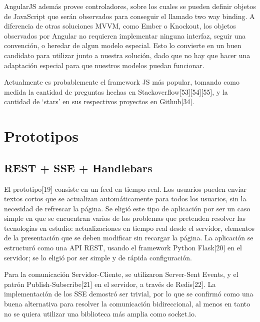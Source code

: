 \documentclass[doc,helv,longtable]{article}
\begin{document}
AngularJS además provee controladores, sobre los cuales se pueden definir objetos de JavaScript que serán observados para conseguir el llamado two way binding. A diferencia de otras soluciones MVVM, como Ember o Knockout, los objetos observados por Angular no requieren implementar ninguna interfaz, seguir una convención, o heredar de algun modelo especial. Esto lo convierte en un buen candidato para utilizar junto a nuestra solución, dado que no hay que hacer una adaptación especial para que nuestros modelos puedan funcionar. 

Actualmente es probablemente el framework JS más popular, tomando como medida la cantidad de preguntas hechas en Stackoverflow[53][54][55], y la cantidad de ‘stars’ en sus respectivos proyectos en Github[34].\section{Prototipos}
\subsection{REST + SSE + Handlebars}


El prototipo[19] consiste en un feed en tiempo real. Los usuarios pueden enviar textos cortos que se actualizan automáticamente para todos los usuarios, sin la necesidad de refrescar la página. Se eligió este tipo de aplicación por ser un caso simple en que se encuentran varios de los problemas que pretenden resolver las tecnologías en estudio: actualizaciones en tiempo real desde el servidor, elementos de la presentación que se deben modificar sin recargar la página. La aplicación se estructuró como una API REST, usando el framework Python Flask[20] en el servidor; se lo eligió por ser simple y de rápida configuración. 

Para la comunicación Servidor-Cliente, se utilizaron Server-Sent Events, y el patrón Publish-Subscribe[21] en el servidor, a través de Redis[22]. La implementación de los SSE demostró ser trivial, por lo que se confirmó como una buena alternativa para resolver la comunicación bidireccional, al menos en tanto no se quiera utilizar una biblioteca más amplia como socket.io.
\end{document}
